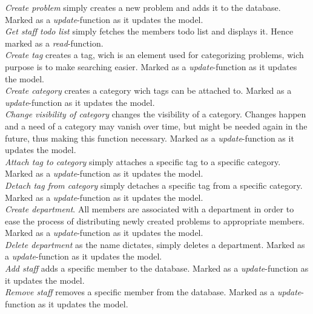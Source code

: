 \emph{Create problem} simply creates a new problem and adds it to the database. Marked as a \textit{update}-function as it updates the model.  \\
\emph{Get staff todo list} simply fetches the \astaff[] members todo list and displays it. Hence marked as a \textit{read}-function. \\
\emph{Create tag} creates a tag, wich is an element used for categorizing problems, wich purpose is to make searching easier. Marked as a \textit{update}-function as it updates the model. \\
\emph{Create category} creates a category wich tags can be attached to. Marked as a \textit{update}-function as it updates the model. \\
\emph{Change visibility of category} changes the visibility of a category. Changes happen and a need of a category may vanish over time, but might be needed again in the future, thus making this function necessary. Marked as a \textit{update}-function as it updates the model. \\
\emph{Attach tag to category} simply attaches a specific tag to a specific category. Marked as a \textit{update}-function as it updates the model. \\
\emph{Detach tag from category} simply detaches a specific tag from a specific category. Marked as a \textit{update}-function as it updates the model. \\
\emph{Create department}. All \astaff[] members are associated with a department in order to ease the process of distributing newly created problems to appropriate \astaff[] members. Marked as a \textit{update}-function as it updates the model. \\
\emph{Delete department} as the name dictates, simply deletes a department. Marked as a \textit{update}-function as it updates the model. \\
\emph{Add staff} adds a specific \astaff[] member to the database. Marked as a \textit{update}-function as it updates the model. \\
\emph{Remove staff} removes a specific \astaff[] member from the database. Marked as a \textit{update}-function as it updates the model. \\

